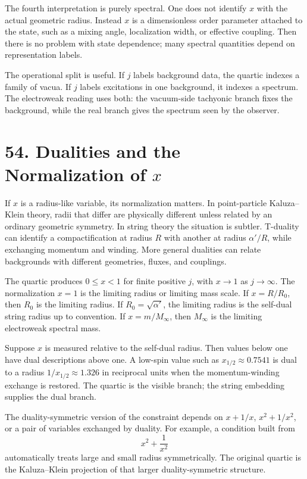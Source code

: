 \documentclass[11pt]{article}
\begin{document}
The fourth interpretation is purely spectral. One does not identify \(x\) with the actual geometric radius. Instead \(x\) is a dimensionless order parameter attached to the state, such as a mixing angle, localization width, or effective coupling. Then there is no problem with state dependence; many spectral quantities depend on representation labels.

The operational split is useful. If \(j\) labels background data, the quartic indexes a family of vacua. If \(j\) labels excitations in one background, it indexes a spectrum. The electroweak reading uses both: the vacuum-side tachyonic branch fixes the background, while the real branch gives the spectrum seen by the observer.

\section*{54. Dualities and the Normalization of \(x\)}

If \(x\) is a radius-like variable, its normalization matters. In point-particle Kaluza--Klein theory, radii that differ are physically different unless related by an ordinary geometric symmetry. In string theory the situation is subtler. T-duality can identify a compactification at radius \(R\) with another at radius \(\alpha'/R\), while exchanging momentum and winding. More general dualities can relate backgrounds with different geometries, fluxes, and couplings.

The quartic produces \(0\leq x<1\) for finite positive \(j\), with \(x\to1\) as \(j\to\infty\). The normalization \(x=1\) is the limiting radius or limiting mass scale. If \(x=R/R_0\), then \(R_0\) is the limiting radius. If \(R_0=\sqrt{\alpha'}\), the limiting radius is the self-dual string radius up to convention. If \(x=m/M_\infty\), then \(M_\infty\) is the limiting electroweak spectral mass.

Suppose \(x\) is measured relative to the self-dual radius. Then values below one have dual descriptions above one. A low-spin value such as \(x_{1/2}\approx0.7541\) is dual to a radius \(1/x_{1/2}\approx1.326\) in reciprocal units when the momentum-winding exchange is restored. The quartic is the visible branch; the string embedding supplies the dual branch.

The duality-symmetric version of the constraint depends on \(x+1/x\), \(x^2+1/x^2\), or a pair of variables exchanged by duality. For example, a condition built from
\[
        x^2+\frac{1}{x^2}
\]
automatically treats large and small radius symmetrically. The original quartic is the Kaluza--Klein projection of that larger duality-symmetric structure.
\end{document}
